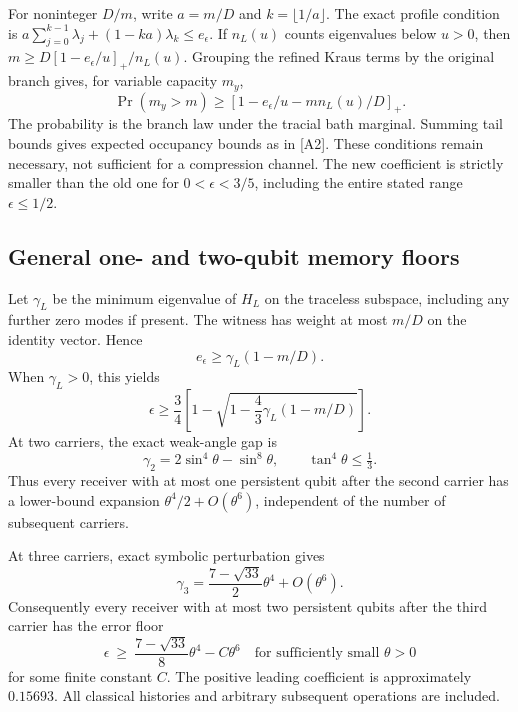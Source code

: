 \documentclass[11pt,a4paper]{article}
\begin{document}
For noninteger $D/m$, write $a=m/D$ and $k=\lfloor1/a\rfloor$. The exact profile condition is $a\sum_{j=0}^{k-1}\lambda_j+(1-ka)\lambda_k\le e_\epsilon$. If $n_L(u)$ counts eigenvalues below $u>0$, then $m\ge D[1-e_\epsilon/u]_+/n_L(u)$. Grouping the refined Kraus terms by the original branch gives, for variable capacity $m_y$,
\[
 \Pr(m_y>m)\ge[1-e_\epsilon/u-m n_L(u)/D]_+.
\]
The probability is the branch law under the tracial bath marginal. Summing tail bounds gives expected occupancy bounds as in [A2]. These conditions remain necessary, not sufficient for a compression channel. The new coefficient is strictly smaller than the old one for $0<\epsilon<3/5$, including the entire stated range $\epsilon\le1/2$.


\subsection{General one- and two-qubit memory floors}
Let $\gamma_L$ be the minimum eigenvalue of $H_L$ on the traceless subspace, including any further zero modes if present. The witness has weight at most $m/D$ on the identity vector. Hence
\[
 e_\epsilon\ge\gamma_L(1-m/D).
\]
When $\gamma_L>0$, this yields
\begin{equation}
 \epsilon\ge\frac34\left[1-\sqrt{1-\frac43\gamma_L(1-m/D)}\right].
 \label{eq:gapfloor}
\end{equation}
At two carriers, the exact weak-angle gap is
\[
 \gamma_2=2\sin^4\theta-\sin^8\theta,
 \qquad \tan^4\theta\le\tfrac13.
\]
Thus every receiver with at most one persistent qubit after the second carrier has a lower-bound expansion $\theta^4/2+O(\theta^6)$, independent of the number of subsequent carriers.

At three carriers, exact symbolic perturbation gives
\begin{equation}
 \gamma_3=\frac{7-\sqrt{33}}2\theta^4+O(\theta^6).
\end{equation}
Consequently every receiver with at most two persistent qubits after the third carrier has the error floor
\begin{equation}
 \epsilon\ \ge\ \frac{7-\sqrt{33}}8\theta^4-C\theta^6
 \quad\text{for sufficiently small }\theta>0
 \label{eq:twoqubit}
\end{equation}
for some finite constant $C$. The positive leading coefficient is approximately $0.15693$. All classical histories and arbitrary subsequent operations are included.
\end{document}
